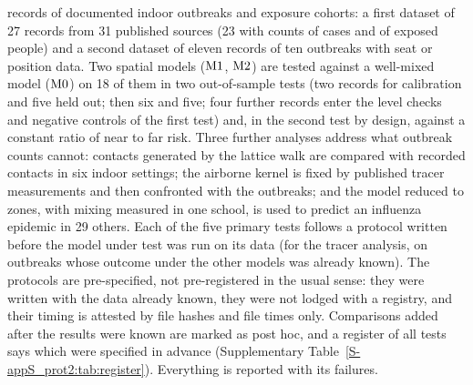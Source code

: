 \begin{enumerate}[label=(\roman*),leftmargin=2.2em,itemsep=1pt,topsep=3pt]
  records of documented indoor outbreaks and exposure cohorts: a first dataset of 27 records from 31
  published sources (23 with counts of cases and of exposed people) and a second dataset of eleven records of ten
  outbreaks with seat or position data. Two spatial models ($\mathrm{M1}$, $\mathrm{M2}$) are tested against a well-mixed
  model ($\mathrm{M0}$) on 18 of them in two out-of-sample tests (two records for calibration and five held out;
  then six and five; four further records enter the level checks and negative controls of the first test) and, in the second test by design, against a constant ratio of near to far risk. Three
  further analyses address what outbreak counts cannot: contacts generated by the lattice walk are compared
  with recorded contacts in six indoor settings; the airborne kernel is fixed by published tracer measurements
  and then confronted with the outbreaks; and the model reduced to zones, with mixing measured in one school,
  is used to predict an influenza epidemic in 29 others. Each of the five primary tests follows a protocol
  written before the model under test was run on its data (for the tracer analysis, on outbreaks whose outcome
  under the other models was already known). The protocols are pre-specified, not pre-registered in the usual
  sense: they were written with the data already known, they were not lodged with a registry, and their timing
  is attested by file hashes and file times only. Comparisons added after the results were known are marked
  as post hoc, and a register of all tests says which were specified in advance
  (Supplementary Table~\ref{S-appS_prot2:tab:register}). Everything is reported with its failures.
\end{enumerate}

